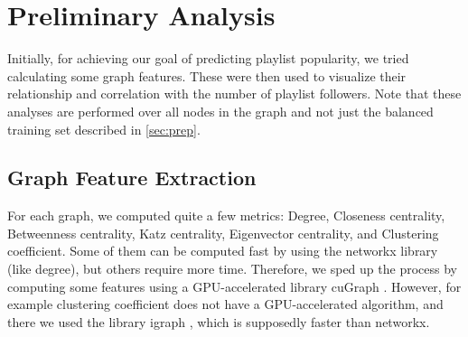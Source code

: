 \documentclass[9pt,twocolumn,twoside]{pnas-report}
\begin{document}





\section{Preliminary Analysis}
Initially, for achieving our goal of predicting playlist popularity, we tried calculating some graph features. These were then used to visualize their relationship and correlation with the number of playlist followers. Note that these analyses are performed over all nodes in the graph and not just the balanced training set described in \ref{sec:prep}.

\subsection{Graph Feature Extraction}
For each graph, we computed quite a few metrics: Degree, Closeness centrality, Betweenness centrality, Katz centrality, Eigenvector centrality, and Clustering coefficient. Some of them can be computed fast by using the networkx library \cite{networkx} (like degree), but others require more time. Therefore, we sped up the process by computing some features using a GPU-accelerated library cuGraph \cite{cugraph}. However, for example clustering coefficient does not have a GPU-accelerated algorithm, and there we used the library igraph \cite{igraph}, which is supposedly faster than networkx.
\end{document}
